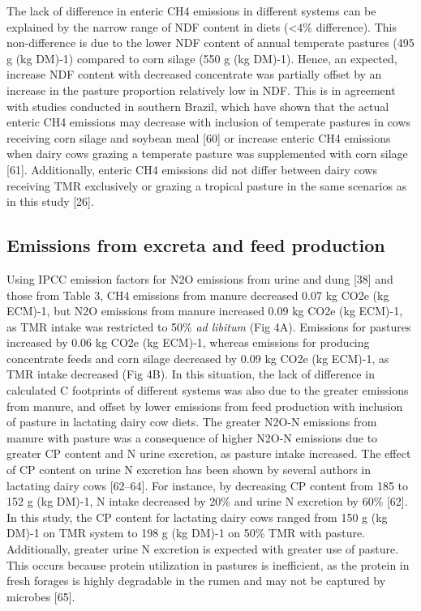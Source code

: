 \documentclass[11pt,a4paper]{article}
\begin{document}
The lack of difference in enteric CH4 emissions in different systems can be explained by the narrow range of NDF content in diets (<4\% difference). This non-difference is due to the lower NDF content of annual temperate pastures (495 g (kg DM)-1) compared to corn silage (550 g (kg DM)-1). Hence, an expected, increase NDF content with decreased concentrate was partially offset by an increase in the pasture proportion relatively low in NDF. This is in agreement with studies conducted in southern Brazil, which have shown that the actual enteric CH4 emissions may decrease with inclusion of temperate pastures in cows receiving corn silage and soybean meal [60] or increase enteric CH4 emissions when dairy cows grazing a temperate pasture was supplemented with corn silage [61]. Additionally, enteric CH4 emissions did not differ between dairy cows receiving TMR exclusively or grazing a tropical pasture in the same scenarios as in this study [26].

\subsection{Emissions from excreta and feed production}

Using IPCC emission factors for N2O emissions from urine and dung [38] and those from Table 3, CH4 emissions from manure decreased 0.07 kg CO2e (kg ECM)-1, but N2O emissions from manure increased 0.09 kg CO2e (kg ECM)-1, as TMR intake was restricted to 50\% \textit{ad libitum} (Fig 4A). Emissions for pastures increased by 0.06 kg CO2e (kg ECM)-1, whereas emissions for producing concentrate feeds and corn silage decreased by 0.09 kg CO2e (kg ECM)-1, as TMR intake decreased (Fig 4B). In this situation, the lack of difference in calculated C footprints of different systems was also due to the greater emissions from manure, and offset by lower emissions from feed production with inclusion of pasture in lactating dairy cow diets. The greater N2O-N emissions from manure with pasture was a consequence of higher N2O-N emissions due to greater CP content and N urine excretion, as pasture intake increased. The effect of CP content on urine N excretion has been shown by several authors in lactating dairy cows [62–64]. For instance, by decreasing CP content from 185 to 152 g (kg DM)-1, N intake decreased by 20\% and urine N excretion by 60\% [62]. In this study, the CP content for lactating dairy cows ranged from 150 g (kg DM)-1 on TMR system to 198 g (kg DM)-1 on 50\% TMR with pasture. Additionally, greater urine N excretion is expected with greater use of pasture. This occurs because protein utilization in pastures is inefficient, as the protein in fresh forages is highly degradable in the rumen and may not be captured by microbes [65].
\end{document}
